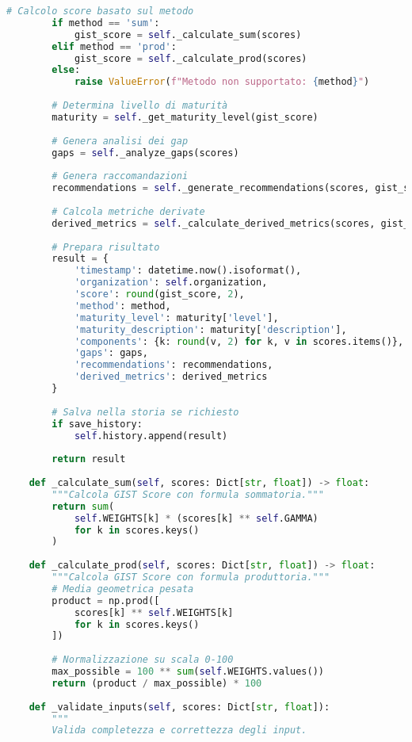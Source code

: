 \begin{lstlisting}[language=Python, caption={Implementazione completa GIST Calculator con validazione e reporting}]
        # Calcolo score basato sul metodo
        if method == 'sum':
            gist_score = self._calculate_sum(scores)
        elif method == 'prod':
            gist_score = self._calculate_prod(scores)
        else:
            raise ValueError(f"Metodo non supportato: {method}")
        
        # Determina livello di maturità
        maturity = self._get_maturity_level(gist_score)
        
        # Genera analisi dei gap
        gaps = self._analyze_gaps(scores)
        
        # Genera raccomandazioni
        recommendations = self._generate_recommendations(scores, gist_score)
        
        # Calcola metriche derivate
        derived_metrics = self._calculate_derived_metrics(scores, gist_score)
        
        # Prepara risultato
        result = {
            'timestamp': datetime.now().isoformat(),
            'organization': self.organization,
            'score': round(gist_score, 2),
            'method': method,
            'maturity_level': maturity['level'],
            'maturity_description': maturity['description'],
            'components': {k: round(v, 2) for k, v in scores.items()},
            'gaps': gaps,
            'recommendations': recommendations,
            'derived_metrics': derived_metrics
        }
        
        # Salva nella storia se richiesto
        if save_history:
            self.history.append(result)
        
        return result
    
    def _calculate_sum(self, scores: Dict[str, float]) -> float:
        """Calcola GIST Score con formula sommatoria."""
        return sum(
            self.WEIGHTS[k] * (scores[k] ** self.GAMMA)
            for k in scores.keys()
        )
    
    def _calculate_prod(self, scores: Dict[str, float]) -> float:
        """Calcola GIST Score con formula produttoria."""
        # Media geometrica pesata
        product = np.prod([
            scores[k] ** self.WEIGHTS[k]
            for k in scores.keys()
        ])
        
        # Normalizzazione su scala 0-100
        max_possible = 100 ** sum(self.WEIGHTS.values())
        return (product / max_possible) * 100
    
    def _validate_inputs(self, scores: Dict[str, float]):
        """
        Valida completezza e correttezza degli input.
        

\end{lstlisting}
